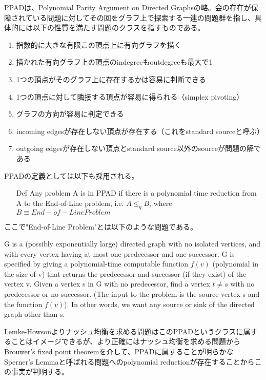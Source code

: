 \documentclass{jsarticle}
\begin{document}
PPADは、Polynomial Parity Argument on Directed Graphsの略。会の存在が保障されている問題に対してその回をグラフ上で探索する一連の問題群を指し、具体的には以下の性質を満たす問題のクラスを指すものである。
\begin{enumerate}
	\item 指数的に大きな有限この頂点上に有向グラフを描く
	\item 描かれた有向グラフ上の頂点のindegreeもoutdegreeも最大で1
	\item 1つの頂点がそのグラフ上に存在するかは容易に判断できる
	\item 1つの頂点に対して隣接する頂点が容易に得られる（simplex pivoting）
	\item グラフの方向が容易に判定できる
	\item incoming edgesが存在しない頂点が存在する（これをstandard sourceと呼ぶ）
	\item outgoing edgesが存在しない頂点とstandard source以外のsourceが問題の解である
\end{enumerate}

PPADの定義としては以下も採用される。
\begin{itemize}
	\item[Def] Any problem A is in PPAD if there is a polynomial time reduction from A to the End-of-Line problem, i.e. $A \leq_q B$, where $B ≡ End-of-Line Problem$
\end{itemize}

ここで"End-of-Line Problem"とは以下のような問題である。

G  is a (possibly exponentially large) directed graph with no isolated vertices, and with every vertex having at most one predecessor and one successor. G is specified by giving a polynomial-time computable function $f(v)$ (polynomial in the size of v) that returns the predecessor and successor (if they exist) of the vertex v. Given a vertex s in G with no predecessor, find a vertex $t \neq s$ with no predecessor or no successor. (The input to the problem is the source vertex s and the function $f(v)$). In other words, we want any source or sink of the directed graph other than s.


Lemke-Howsonよりナッシュ均衡を求める問題はこのPPADというクラスに属することはイメージできるが、より正確にはナッシュ均衡を求める問題からBrouwer's fixed point theoremを介して、PPADに属することが明らかなSperner's Lemmaと呼ばれる問題へのpolynomial reductionが存在することからこの事実が判明する。
\end{document}
